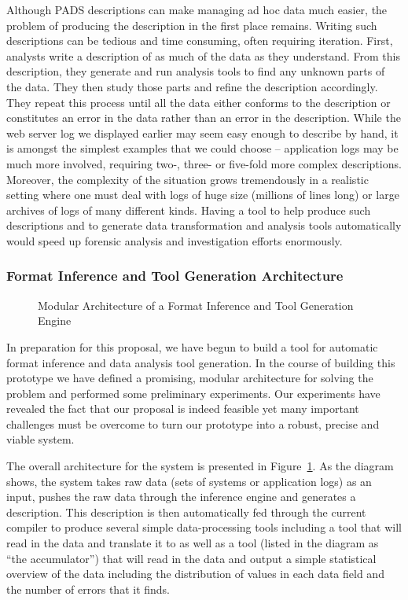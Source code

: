 Although PADS descriptions can make managing ad hoc data much easier,
the problem of producing the description in the first place
remains. Writing such descriptions can be tedious and time consuming,
often requiring iteration. First, analysts write a description of as
much of the data as they understand. From this description, they
generate and run analysis tools to find any unknown parts of the
data. They then study those parts and refine the description
accordingly. They repeat this process until all the data either
conforms to the description or constitutes an error in the data rather
than an error in the description.  While the web server log we displayed
earlier may seem easy enough to describe by hand, it is amongst the
simplest examples that we could choose -- application logs may be much
more involved, requiring two-, three- or five-fold more complex descriptions.  
Moreover, the complexity of the situation grows tremendously in a realistic
setting where one must deal with logs of huge size (millions of lines long)
or large archives of logs of many different kinds. 
Having a tool to help produce such descriptions and to generate
data transformation and analysis tools automatically would speed up
forensic analysis and investigation efforts enormously.

\subsubsection*{Format Inference and Tool Generation Architecture}

\begin{figure}
\begin{center}
\centerline{}
\end{center}
\caption{Modular Architecture of a Format Inference and Tool Generation Engine}
\label{fig:format-inference-engine}
\end{figure}

In preparation for this proposal, we have begun to build a tool for
automatic format inference and data analysis tool generation.  In the
course of building this prototype we have defined a promising, modular 
architecture for solving the problem and performed some preliminary
experiments.  Our experiments have revealed the fact that our proposal
is indeed feasible yet many important challenges must be overcome
to turn our prototype into a robust, precise and viable system.

The overall architecture for the system is presented in
Figure~\ref{fig:format-inference-engine}.  As the diagram shows, the
system takes raw data (sets of systems or application logs) as an
input, pushes the raw data through the inference engine and generates
a \pads{} description.  This description is then automatically fed
through the current \pads{} compiler to produce several simple
data-processing tools including a tool that will read in the data and
translate it to \xml{} as well as a tool (listed in the diagram
as ``the accumulator'')
that will read in the data and output a simple statistical overview
of the data including the distribution of values in each data field and
the number of errors that it finds.

